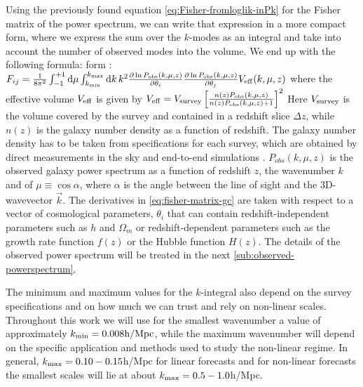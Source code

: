 Using the previously found equation \ref{eq:Fisher-fromloglik-inPk} for the
Fisher matrix of the power spectrum, we can write that expression in a more compact form, where 
we express the sum over the $k$-modes as an integral and take into account the number of observed modes into
the volume. We end up with the following formula:
form \citep{seo_improved_2007, amendola book, dodelson}: 
\beeqc$\label{eq:fisher-matrix-gc}
F_{ij}=\frac{1}{8\pi^{2}}\int_{-1}^{+1}\mbox{d}\mu\int_{k_{\rm min}}^{k_{\rm max}}\mbox{d}k\,k^{2}\frac{\partial\ln
	P_{\mathrm{obs}} (k,\mu,z)}{\partial\theta_{i}}\frac{\partial\ln
	P_{\mathrm{obs}} (k,\mu,z)}{\partial\theta_{j}}V_{\rm eff}(k,\mu,z)
$
where the effective volume $V_{\rm eff}$ is given by
\beeqp$
V_{\rm eff} = V_{\rm survey}\left[\frac{n(z)P_{\mathrm{obs}} (k,\mu,z)}{n(z)P_{\mathrm{obs}} (k,\mu,z)+1}\right]^{2}
$
Here $V_{\rm survey}$
is the volume covered by the survey and contained in a redshift slice
$\Delta z$, while $n(z)$ is the galaxy number density as a function of
redshift. The galaxy number density has to be taken from specifications for each survey, which
are obtained by direct measurements in the sky and end-to-end simulations \cite{Dida, Guzzo, etc}.
$P_{obs}(k,\mu,z)$ is the observed galaxy power
spectrum as a function of redshift $z$, the wavenumber $k$ and
of $\mu\equiv\cos\alpha$, where $\alpha$ is the angle between the
line of sight and the 3D-wavevector $\vec{k}$. 
The derivatives in \cref{eq:fisher-matrix-gc} are taken with
respect to a vector of cosmological parameters, $\theta_{i}$ that can contain
redshift-independent parameters such as $h$ and $\Omega_{m}$ or redshift-dependent
parameters such as the growth rate function $f(z)$ or the Hubble function $H(z)$.
The details of the observed power spectrum will be treated in the next \cref{sub:observed-powerspectrum}.

The minimum and maximum values for the $k$-integral also depend on the survey specifications and
on how much we can trust and rely on non-linear scales. Throughout this work
we will use for
the smallest wavenumber a value of approximately $k_{\rm min}=0.008\textrm{h/Mpc}$, 
while the maximum wavenumber will depend on the specific application and methods used to study the non-linear regime.
In general, $k_{\rm max}={0.10-0.15}$h/Mpc for linear forecasts and for non-linear forecasts 
the smallest scales will lie at about $k_{\rm max}={0.5-1.0}$h/Mpc.


